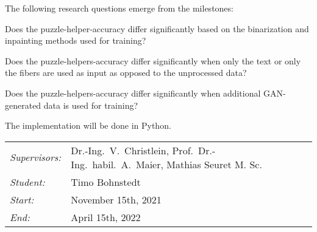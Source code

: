 \documentclass[12pt,a4paper]{article}
\begin{document}
The following research questions emerge from the milestones:

\begin{questions}
	\item  Does the puzzle-helper-accuracy differ significantly based on the binarization and inpainting methods used for training?
	
	\item  Does the puzzle-helpers-accuracy differ significantly when only the text or only the fibers are used as input as opposed to the unprocessed data?  
	
	\item  Does the puzzle-helpers-accuracy differ significantly when additional GAN-generated data is used for training?
\end{questions}

		
The implementation will be done in Python.\\
		
\begin{tabular}{ll}
	\emph{Supervisors:} & Dr.-Ing.~V.~Christlein,  Prof.~Dr.-Ing.~habil.~A.~Maier, Mathias Seuret M. Sc.
	\\
	\emph{Student:}     & Timo Bohnstedt
	\\
	\emph{Start:}       & November 15th, 2021                                            \\
	\emph{End:}         & April 15th, 2022                                        \\
\end{tabular}
\nopagebreak[4]
\small


		
\end{document}
